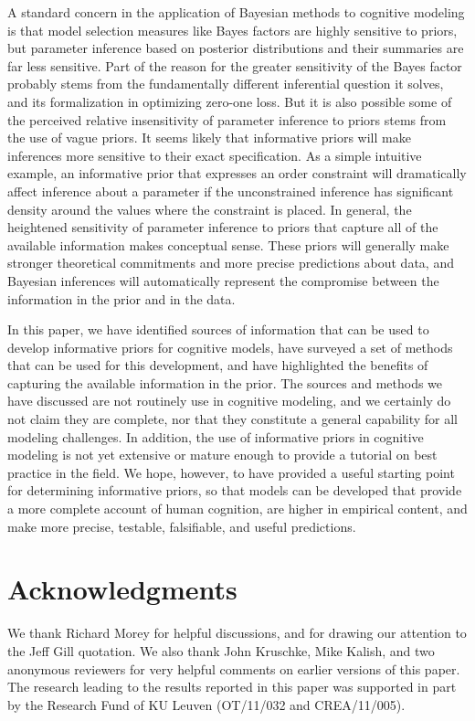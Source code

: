 A standard concern in the application of Bayesian methods to cognitive modeling is that model selection measures like Bayes factors are highly sensitive to priors, but parameter inference based on posterior distributions and their summaries are far less sensitive. Part of the reason for the greater sensitivity of the Bayes factor probably stems from the fundamentally different inferential question it solves, and its formalization in optimizing zero-one loss. But it is also possible some of the perceived relative insensitivity of parameter inference to priors stems from the use of vague priors. It seems likely that informative priors will make inferences more sensitive to their exact specification. As a simple intuitive example, an informative prior that expresses an order constraint will dramatically affect inference about a parameter if the unconstrained inference has significant density around the values where the constraint is placed. In general, the heightened sensitivity of parameter inference to priors that capture all of the available information makes conceptual sense. These priors will generally make stronger theoretical commitments and more precise predictions about data, and Bayesian inferences will automatically represent the compromise between the information in the prior and in the data. 

In this paper, we have identified sources of information that can be used to develop informative priors for cognitive models, have surveyed a set of methods that can be used for this development, and have highlighted the benefits of capturing the available information in the prior. The sources and methods we have discussed are not routinely use in cognitive modeling, and we certainly do not claim they are complete, nor that they constitute a general capability for all modeling challenges. In addition, the use of informative priors in cognitive modeling is not yet extensive or mature enough to provide a tutorial on best practice in the field. We hope, however, to have provided a useful starting point for determining informative priors, so that models can be developed that provide a more complete account of human cognition, are higher in empirical content, and make more precise, testable, falsifiable, and useful predictions. 

\section*{Acknowledgments}
We thank Richard Morey for helpful discussions, and for drawing our attention to the Jeff Gill quotation. We also thank John Kruschke, Mike Kalish, and two anonymous reviewers for very helpful comments on earlier versions of this paper. The research leading to the results reported in this paper was supported in part by the Research Fund of KU Leuven (OT/11/032 and CREA/11/005).




